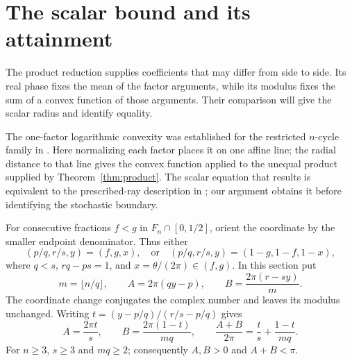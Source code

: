 \documentclass[11pt,a4paper]{article}
\theoremstyle{definition}
\theoremstyle{remark}
\numberwithin{equation}{section}
\begin{document}


\section{The scalar bound and its attainment}
The product reduction supplies coefficients that may differ from side to side.
Its real phase fixes the mean of the factor arguments, while its modulus fixes
the sum of a convex function of those arguments.  Their comparison will give
the scalar radius and identify equality.

The one-factor logarithmic convexity was established for the restricted
$n$-cycle family in \cite[Lemmas~4.2 and~5.2]{VGNCycle}. Here normalizing
each factor places it on one affine line; the radial distance to that line
gives the convex function applied to the unequal product supplied by
Theorem~\ref{thm:product}. The scalar equation that results is equivalent
to the prescribed-ray description in
\cite[Theorems~1.2 and~4.3; Lemma~4.4]{KirklandLaffeySmigoc}; our
argument obtains it before identifying the stochastic boundary.

For consecutive fractions $f<g$ in $F_n\cap[0,1/2]$, orient the coordinate by the smaller endpoint denominator. Thus either
\[
 (p/q,r/s,y)=(f,g,x),
 \quad\text{or}\quad
 (p/q,r/s,y)=(1-g,1-f,1-x),
\]
where $q<s$, $rq-ps=1$, and $x=\theta/(2\pi)\in(f,g)$.
In this section put
\begin{equation}\label{eq:scalar-data}
 m=\lfloor n/q\rfloor,\qquad
 A=2\pi(qy-p),\qquad B=\frac{2\pi(r-sy)}m.
\end{equation}
The coordinate change conjugates the complex number and leaves its modulus unchanged.
Writing $t=(y-p/q)/(r/s-p/q)$ gives
\begin{equation}\label{eq:angle-budget}
 A=\frac{2\pi t}s,\qquad B=\frac{2\pi(1-t)}{mq},\qquad
 \frac{A+B}{2\pi}=\frac ts+\frac{1-t}{mq}.
\end{equation}
For $n\ge3$, $s\ge3$ and $mq\ge2$; consequently $A,B>0$ and $A+B<\pi$.
\end{document}
